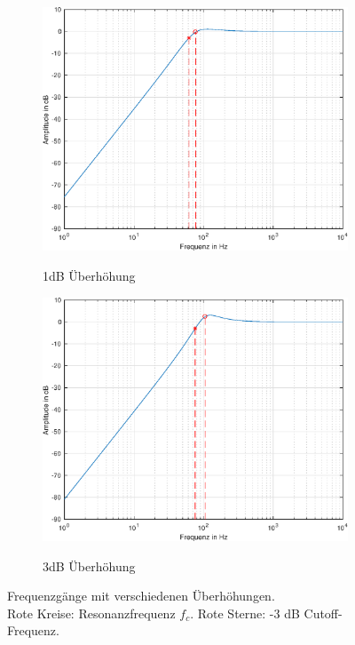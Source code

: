 \begin{figure}[H]
    \centering
    
    \begin{subfigure}{.49\textwidth}
        \centering
        \caption{1dB Überhöhung}
        \includegraphics[width=0.85\linewidth]{Figures/Frequenzgang_1dB.eps}
        \label{Frequenzgang_1dB}
    \end{subfigure}
    \begin{subfigure}{.49\textwidth}
        \centering
        \caption{3dB Überhöhung}
        \includegraphics[width=0.85\linewidth]{Figures/Frequenzgang_3dB.eps}
        \label{Frequenzgang_3dB}
    \end{subfigure}
    \caption{Frequenzgänge mit verschiedenen Überhöhungen.\\ 
    Rote Kreise: Resonanzfrequenz $f_c$. Rote Sterne: -3 dB Cutoff-Frequenz.   }
    \label{fig:Ueberhoehung}
\end{figure}
